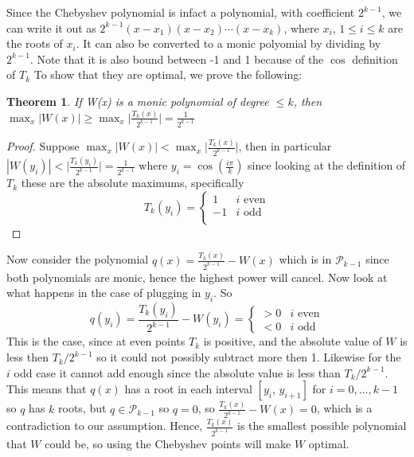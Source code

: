 \documentclass{article}
\newtheorem*{theorem}{Theorem}
\begin{document}
\begin{enumerate}
\begin{enumerate}
            Since the Chebyshev polynomial is infact a polynomial, with coefficient $2^{k-1}$, we can write it out as $2^{k-1}(x-x_1)(x-x_2)\cdots(x-x_k)$, where $x_i,\, 1\leq i \leq k$ are the roots of $x_i$. It can also be converted to a monic polyomial by dividing by $2^{k-1}$. Note that it is also bound between -1 and 1 because of the $\cos$ definition of $T_k$ To show that they are optimal, we prove the following:
            \begin{theorem}
                If W(x) is a monic polynomial of degree $\leq k$, then $\displaystyle \max_{x} |W(x)| \geq \max_{x} \Big| \frac{T_k(x)}{2^{k-1}}\Big| = \frac{1}{2^{k-1}}$
            \end{theorem}
            \begin{proof}
                Suppose $\displaystyle \max_{x} |W(x)| < \max_{x} \Big| \frac{T_k(x)}{2^{k-1}}\Big|$, then in particular $|W(y_i)| < \Big| \frac{T_k(y_i)}{2^{k-1}}\Big| = \frac{1}{2^{k-1}}$ where $y_i = \cos(\frac{i\pi}{k})$ since looking at the definition of $T_k$ these are the absolute maximums, specifically
                \[
                    T_k(y_i) =
                    \begin{cases}
                         1 & i \text{ even} \\
                        -1 & i \text{ odd} \\
                    \end{cases}
                \]
            \end{proof}
            Now consider the polynomial $q(x) = \frac{T_k(x)}{2^{k-1}} - W(x)$ which is in $\mathcal{P}_{k-1}$ since both polynomials are monic, hence the highest power will cancel. Now look at what happens in the case of plugging in $y_i$. So 
            \[ q(y_i) = \frac{T_k(y_i)}{2^{k-1}} - W(y_i)
                = \begin{cases}
                    > 0 & i \text{ even} \\
                    < 0 & i \text{ odd}
                  \end{cases}
                  \]
            This is the case, since at even points $T_k$ is positive, and the absolute value of $W$ is less then $T_k/2^{k-1}$ so it could not possibly subtract more then 1. Likewise for the $i$ odd case it cannot add enough since the absolute value is less than $T_k/2^{k-1}$. This means that $q(x)$ has a root in each interval $[y_i,\, y_{i+1}]$ for $i=0,\dots,k-1$ so $q$ has $k$ roots, but $q \in \mathcal{P}_{k-1}$ so $q = 0$, so $\frac{T_k(x)}{2^{k-1}} - W(x) = 0$, which is a contradiction to our assumption. Hence, $\frac{T_k(x)}{2^{k-1}}$ is the smallest possible polynomial that $W$ could be, so using the Chebyshev points will make $W$ optimal.
        


\end{enumerate}
\end{enumerate}
\end{document}
